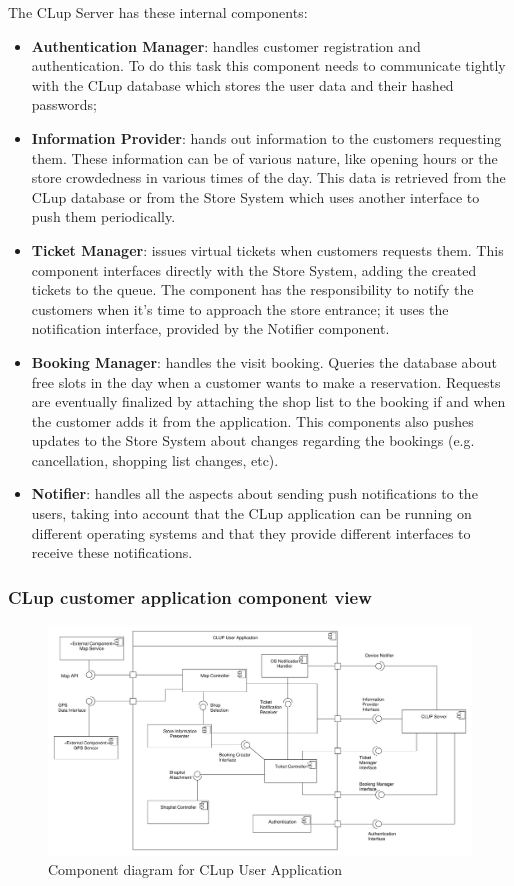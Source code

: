 The CLup Server has these internal components:
\begin{itemize}
    \item \textbf{Authentication Manager}: handles customer registration and authentication. To do this task this component needs to communicate tightly with the CLup database which stores the user data and their hashed passwords;
    \item \textbf{Information Provider}: hands out information to the customers requesting them. These information can be of various nature, like opening hours or the store crowdedness in various times of the day. This data is retrieved from the CLup database or from the Store System which uses another interface to push them periodically.
    \item \textbf{Ticket Manager}: issues virtual tickets when customers requests them. This component interfaces directly with the Store System, adding the created tickets to the queue. The component has the responsibility to notify the customers when it's time to approach the store entrance; it uses the notification interface, provided by the Notifier component.
    \item \textbf{Booking Manager}: handles the visit booking. Queries the database about free slots in the day when a customer wants to make a reservation. Requests are eventually finalized by attaching the shop list to the booking if and when the customer adds it from the application. This components also pushes updates to the Store System about changes regarding the bookings (e.g. cancellation, shopping list changes, etc).
    \item \textbf{Notifier}: handles all the aspects about sending push notifications to the users, taking into account that the CLup application can be running on different operating systems and that they provide different interfaces to receive these notifications.
\end{itemize}

\subsubsection{CLup customer application component view}
\begin{figure}[H]
    \includegraphics[width=\textwidth]{Images/UML_user_app_component.pdf}
    \caption{\label{fig:UML_comp_CLup_user_app}Component diagram for CLup User Application}
\end{figure}

